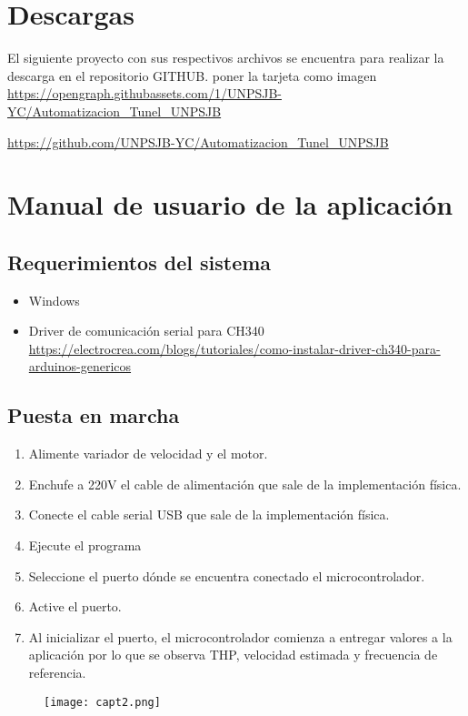 \section{Descargas}
El siguiente proyecto con sus respectivos archivos se encuentra para realizar la descarga en el repositorio GITHUB.
poner la tarjeta como imagen
\url{https://opengraph.githubassets.com/1/UNPSJB-YC/Automatizacion_Tunel_UNPSJB}

\url{https://github.com/UNPSJB-YC/Automatizacion_Tunel_UNPSJB}
\newpage
\section{Manual de usuario de la aplicación}
\subsection{Requerimientos del sistema}
\begin{itemize}
	\item Windows
	\item Driver de comunicación serial para CH340 \url{https://electrocrea.com/blogs/tutoriales/como-instalar-driver-ch340-para-arduinos-genericos}
\end{itemize}


\subsection{Puesta en marcha}
\begin{enumerate}
	\item Alimente variador de velocidad y el motor.
	\item Enchufe a 220V el cable de alimentación que sale de la implementación física.
	\item Conecte el cable serial USB que sale de la implementación física.
	\item Ejecute el programa 
	\item Seleccione el puerto dónde se encuentra conectado el microcontrolador.
	\item Active el puerto.
	\item Al inicializar el puerto, el microcontrolador comienza a entregar valores a la aplicación por lo que se observa THP, velocidad estimada y frecuencia de referencia. 
	
\end{enumerate}

\begin{figure}[H]
	\centering
	\texttt{[image: capt2.png]}
	\label{fig:capt2}
\end{figure}



